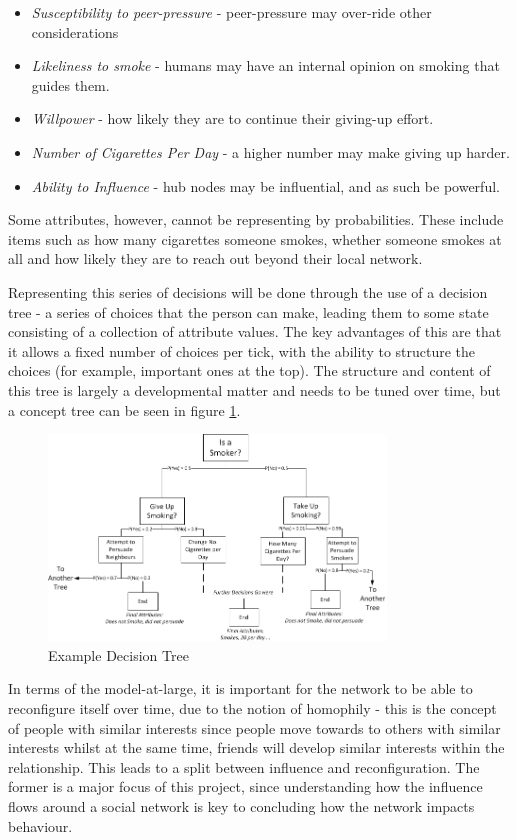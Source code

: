 \documentclass[]{article}
\begin{document}
\begin{itemize}
\item \emph{Susceptibility to peer-pressure} - peer-pressure may over-ride other considerations
\item \emph{Likeliness to smoke} - humans may have an internal opinion on smoking that guides them.
\item \emph{Willpower} - how likely they are to continue their giving-up effort.
\item \emph{Number of Cigarettes Per Day} - a higher number may make giving up harder.
\item \emph{Ability to Influence} - hub nodes may be influential, and as such be powerful.
\end{itemize}

Some attributes, however, cannot be representing by probabilities. These include items such as how many cigarettes someone smokes, whether someone smokes at all and how likely they are to reach out beyond their local network.

Representing this series of decisions will be done through the use of a decision tree - a series of choices that the person can make, leading them to some state consisting of a collection of attribute values. The key advantages of this are that it allows a fixed number of choices per tick, with the ability to structure the choices (for example, important ones at the top). The structure and content of this tree is largely a developmental matter and needs to be tuned over time, but a concept tree can be seen in figure \ref{fig:Sample decision tree}.


\begin{figure}
	\centering
		\includegraphics[width=0.80\textwidth]{sdt.jpg}
	\caption{Example Decision Tree}
	\label{fig:Sample decision tree}
\end{figure}


In terms of the model-at-large, it is important for the network to be able to reconfigure itself over time, due to the notion of homophily \cite{USN} - this is the concept of people with similar interests since people move towards to others with similar interests whilst at the same time, friends will develop similar interests within the relationship. This leads to a split between influence and reconfiguration. The former is a major focus of this project, since understanding how the influence flows around a social network is key to concluding how the network impacts behaviour. 
\end{document}
